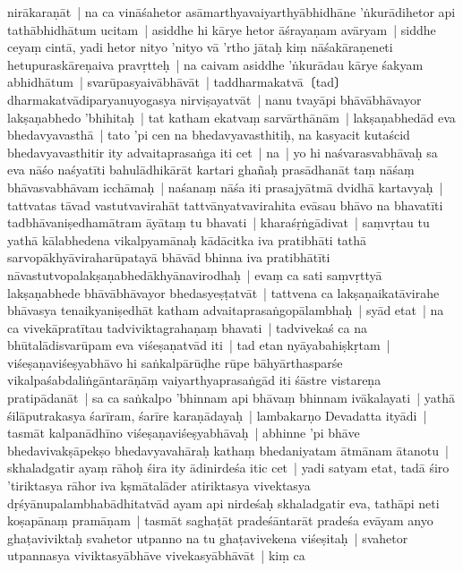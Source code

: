 \documentclass[article,a4paper]{memoir}
\begin{document}
nirā\-karaṇā\-t | \label{thakur75-123.8} na ca vinā\-śahetor asā\-marthyavaiyarthyā\-bhidhā\-ne 'ṅkurā\-dihetor api tathā\-bhidhā\-tum ucitam | asiddhe hi kā\-rye hetor ā\-śrayaṇam avā\-ryam | siddhe ceyaṃ cintā\-, yadi hetor nityo 'nityo vā\- 'rtho jā\-taḥ kiṃ nā\-śakā\-raṇeneti hetupuraskā\-reṇaiva pravṛtteḥ | na caivam asiddhe 'ṅkurā\-dau kā\-rye śakyam abhidhā\-tum | svarū\-pasyaivā\-bhā\-vā\-t | taddharmakatvā\-〔tad〕dharmakatvā\-diparyanuyogasya nirviṣayatvā\-t | \label{thakur75-123.13} nanu tvayā\-pi bhā\-vā\-bhā\-vayor lakṣaṇabhedo 'bhihitaḥ | tat katham ekatvaṃ sarvā\-rthā\-nā\-m | lakṣaṇabhedā\-d eva bhedavyavasthā\- | tato 'pi cen na bhedavyavasthitiḥ, na kasyacit kutaścid bhedavyavasthitir ity advaitaprasaṅga iti cet | \label{thakur75-123.15} na | yo hi naśvarasvabhā\-vaḥ sa eva nā\-śo naśyatī\-ti bahulā\-dhikā\-rā\-t kartari ghañaḥ prasā\-dhanā\-t taṃ nā\-śaṃ bhā\-vasvabhā\-vam icchā\-maḥ | naśanaṃ nā\-śa iti prasajyā\-tmā\- dvidhā\- kartavyaḥ | tattvatas tā\-vad vastutvavirahā\-t tattvā\-nyatvavirahita evā\-sau bhā\-vo na bhavatī\-ti tadbhā\-vaniṣedhamā\-tram ā\-yā\-taṃ tu bhavati | kharaśṛṅgā\-divat | saṃvṛtau tu yathā\- kā\-labhedena vikalpyamā\-naḥ kā\-dā\-citka iva pratibhā\-ti tathā\- sarvopā\-khyā\-viraharū\-patayā\- bhā\-vā\-d bhinna iva pratibhā\-tī\-ti nā\-vastutvopalakṣaṇabhedā\-khyā\-navirodhaḥ | evaṃ ca sati saṃvṛttyā\- lakṣaṇabhede bhā\-vā\-bhā\-vayor bhedasyeṣṭatvā\-t | tattvena ca lakṣaṇaikatā\-virahe bhā\-vasya tenaikyaniṣedhā\-t katham advaitaprasaṅgopā\-lambhaḥ | \label{thakur75-123.24} syā\-d etat | na ca vivekā\-pratī\-tau tadviviktagrahaṇaṃ bhavati | tadvivekaś ca na bhū\-talā\-disvarū\-pam eva viśeṣaṇatvā\-d iti | \label{thakur75-123.25} tad etan nyā\-yabahiṣkṛtam | viśeṣaṇaviśeṣyabhā\-vo hi saṅkalpā\-rū\-ḍhe rū\-pe bā\-hyā\-rthasparśe vikalpaśabdaliṅgā\-ntarā\-ṇā\-ṃ vaiyarthyaprasaṅgā\-d iti śā\-stre vistareṇa pratipā\-danā\-t | sa ca saṅkalpo 'bhinnam api bhā\-vaṃ bhinnam ivā\-kalayati | yathā\- śilā\-putrakasya śarī\-ram, śarī\-re karaṇā\-dayaḥ | lambakarṇo Devadatta ityā\-di | tasmā\-t kalpanā\-dhī\-no viśeṣaṇaviśeṣyabhā\-vaḥ | abhinne 'pi bhā\-ve bhedavivakṣā\-pekṣo bhedavyavahā\-raḥ kathaṃ bhedaniyatam ā\-tmā\-nam ā\-tanotu | \label{thakur75-123.31} skhaladgatir ayaṃ rā\-hoḥ śira ity ā\-dinirdeśa itic cet | \label{thakur75-123.31a} yadi satyam etat, tadā\- śiro 'tiriktasya rā\-hor iva kṣmā\-talā\-der atiriktasya vivektasya dṛśyā\-nupalambhabā\-dhitatvā\-d ayam api nirdeśaḥ skhaladgatir eva, tathā\-pi neti koṣapā\-naṃ pramā\-ṇam | tasmā\-t saghaṭā\-t pradeśā\-ntarā\-t pradeśa evā\-yam anyo ghaṭaviviktaḥ svahetor utpanno na tu ghaṭavivekena viśeṣitaḥ | svahetor utpannasya viviktasyā\-bhā\-ve vivekasyā\-bhā\-vā\-t | \label{thakur75-124.3} kiṃ ca
	\pend
      
\end{document}
